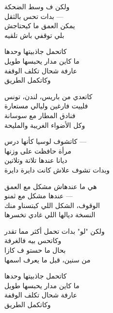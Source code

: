 \begin{lyrics}[12em]
\begin{Arabic}
ولكن ف وسط الضحكة\\
بدات تحس بالثقل —\\
يمكن العمق ما كيحتاجش\\
بلي توقفي باش تلقيه
\end{Arabic}


\begin{Arabic}
كاتحمل جاذبيتها وحدها\\
ما كاين مدار يحبسها طويل\\
عارفة شحال تكلف الوقفة\\
وكاتكمل الطريق
\end{Arabic}

\begin{Arabic}
كاتعدي من باريس، لندن، تونس\\
فلييت فارغين وليالي مستعارة\\
فنادق المطار مع سوسانة\\
وكل الأضواء الغريبة والمليحة

كاتشوف لوسيا كأنها درس —\\
مرأة حافظت على وزنها\\
ديانا عندها تلاتة وتلاتين\\
وبدات تشوف علاش كانت دايرة دايرة
\end{Arabic}

\begin{Arabic}
هي ما عندهاش مشكل مع العمق\\
عندها مشكل مع ثمنو —\\
الوقوف، الشكل اللي كيتسناو منك\\
النسخة ديالها اللي غادي تخسرها

ولكن "لو" بدات تحمل أكثر مما تقدر\\
وكاتحس بيه فالغرفة\\
بحال ما حستو ف كازا\\
من سنين، قبل ما يعرف اسمها
\end{Arabic}


\begin{Arabic}
كاتحمل جاذبيتها وحدها\\
ما كاين مدار يحبسها طويل\\
عارفة شحال تكلف الوقفة\\
وكاتكمل الطريق
\end{Arabic}

\end{lyrics}

